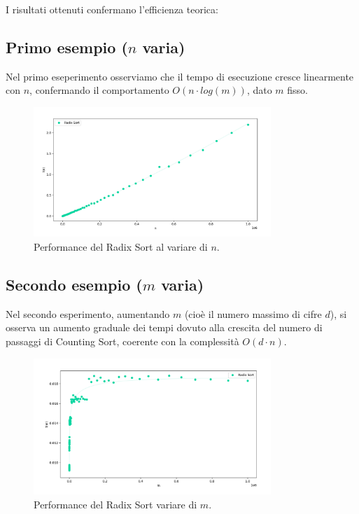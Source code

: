 \documentclass[a4paper, 12pt, oneside]{book}
\begin{document}
\noindent I risultati ottenuti confermano l'efficienza teorica:


\subsection{Primo esempio ($n$ varia)}

Nel primo eseperimento osserviamo che il tempo di esecuzione cresce linearmente con \(n\), confermando il comportamento \(O(n \cdot log(m))\), dato \(m\) fisso.

\begin{figure}[H]
    \centering
    \includegraphics[width=0.8\textwidth]{images/grafico_radix_sort_n.png}
    \caption{Performance del Radix Sort al variare di \(n\).}
    \label{fig:radix_sort_way_n}
\end{figure}

\subsection{Secondo esempio ($m$ varia)}

Nel secondo esperimento, aumentando \(m\) (cioè il numero massimo di cifre \(d\)), si osserva un aumento graduale dei tempi dovuto alla crescita del numero di passaggi di Counting Sort, coerente con la complessità \(O(d \cdot n)\).

\begin{figure}[H]
    \centering
    \includegraphics[width=0.8\textwidth]{images/grafico_radix_sort_m.png}
    \caption{Performance del Radix Sort variare di \(m\).}
    \label{fig:radix_sort_3_way_m}
\end{figure}
\end{document}
